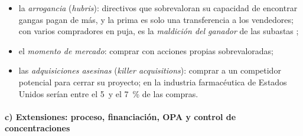 \documentclass[11pt]{article}
\begin{document}
\begin{itemize}
\begin{itemize}
  \item la \emph{arrogancia} (\emph{hubris}): directivos que sobrevaloran su capacidad de encontrar gangas pagan de más, y la prima es solo una transferencia a los vendedores\nocite{Roll1986Hubris}; con varios compradores en puja, es la \emph{maldición del ganador} de las subastas ;
  \item el \emph{momento de mercado}: comprar con acciones propias sobrevaloradas\nocite{ShleiferVishny2003Stock};
  \item las \emph{adquisiciones asesinas} (\emph{killer acquisitions}): comprar a un competidor potencial para cerrar su proyecto; en la industria farmacéutica de Estados Unidos serían entre el 5~y el 7~\% de las compras\nocite{CunninghamEdererMa2021Killer}.
  \end{itemize}
\end{itemize}

\paragraph{c) Extensiones: proceso, financiación, OPA y control de concentraciones}
\end{document}
